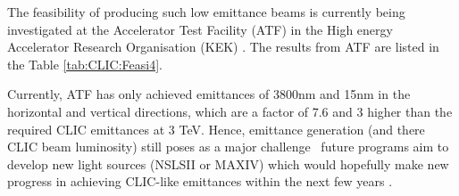 \begin{table}[!htb]
\caption{Required parameters of the beam before injection and at extraction from the damping rings (emittance parameters). \cite{CLIC:Concept}}
\label{tab:CLIC:Feasi3}
\end{table}

The feasibility of producing such low emittance beams is currently being investigated at the Accelerator Test Facility (ATF) \cite{KEK:ATF} in the High energy Accelerator Research Organisation (KEK) \cite{KEK}. The results from ATF are listed in the Table \ref{tab:CLIC:Feasi4}.

Currently, ATF has only achieved emittances of 3800nm and 15nm in the horizontal and vertical directions, which are a factor of 7.6 and 3 higher than the required CLIC emittances at 3 TeV. Hence, emittance generation (and there CLIC beam luminosity) still poses as a major challenge \textemdash \, future programs aim to develop new light sources (NSLSII or MAXIV) which would hopefully make new progress in achieving CLIC-like emittances within the next few years \cite{CLIC:Concept}.

